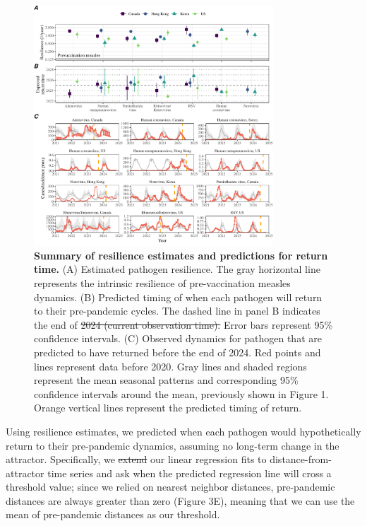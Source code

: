\documentclass[12pt]{article}
\newcommand{\comment}{\showcomment}
\newcommand{\showcomment}[3]{\textcolor{#1}{\textbf{[#2: }\textsl{#3}\textbf{]}}}
\newcommand{\swp}[1]{\comment{magenta}{SWP}{#1}}
\providecommand{\DIFaddtex}[1]{{\protect\color{blue}\uwave{#1}}} %
\providecommand{\DIFdeltex}[1]{{\protect\color{red}\sout{#1}}}                      %
\providecommand{\DIFaddbegin}{} %
\providecommand{\DIFaddend}{} %
\providecommand{\DIFdelbegin}{} %
\providecommand{\DIFdelend}{} %
\providecommand{\DIFaddFL}[1]{\DIFadd{#1}} %
\providecommand{\DIFdelFL}[1]{\DIFdel{#1}} %
\providecommand{\DIFaddbeginFL}{} %
\providecommand{\DIFaddendFL}{} %
\providecommand{\DIFdelbeginFL}{} %
\providecommand{\DIFdelendFL}{} %
\providecommand{\DIFadd}[1]{\texorpdfstring{\DIFaddtex{#1}}{#1}} %
\providecommand{\DIFdel}[1]{\texorpdfstring{\DIFdeltex{#1}}{}} %
\newcommand{\DIFscaledelfig}{0.5}
\newlength{\DIFdelgraphicswidth} %
\newlength{\DIFdelgraphicsheight} %
\newcommand{\DIFaddincludegraphics}[2][]{{\color{blue}\fbox{\DIFOincludegraphics[#1]{#2}}}} %
\newcommand{\DIFdelincludegraphics}[2][]{%
\sbox{\DIFdelgraphicsbox}{\DIFOincludegraphics[#1]{#2}}%
\settoboxwidth{\DIFdelgraphicswidth}{\DIFdelgraphicsbox} %
\settoboxtotalheight{\DIFdelgraphicsheight}{\DIFdelgraphicsbox} %
\scalebox{\DIFscaledelfig}{%
\parbox[b]{\DIFdelgraphicswidth}{\usebox{\DIFdelgraphicsbox}\\[-\baselineskip] \rule{\DIFdelgraphicswidth}{0em}}\llap{\resizebox{\DIFdelgraphicswidth}{\DIFdelgraphicsheight}{%
\setlength{\unitlength}{\DIFdelgraphicswidth}%
\begin{picture}(1,1)%
\thicklines\linethickness{2pt} %
{\color[rgb]{1,0,0}\put(0,0){\framebox(1,1){}}}%
{\color[rgb]{1,0,0}\put(0,0){\line( 1,1){1}}}%
{\color[rgb]{1,0,0}\put(0,1){\line(1,-1){1}}}%
\end{picture}%
}\hspace*{3pt}}} %
} %
\DeclareRobustCommand{\DIFaddbegin}{\DIFOaddbegin \let\includegraphics\DIFaddincludegraphics} %
\DeclareRobustCommand{\DIFaddend}{\DIFOaddend \let\includegraphics\DIFOincludegraphics} %
\DeclareRobustCommand{\DIFdelbegin}{\DIFOdelbegin \let\includegraphics\DIFdelincludegraphics} %
\DeclareRobustCommand{\DIFdelend}{\DIFOaddend \let\includegraphics\DIFOincludegraphics} %
\DeclareRobustCommand{\DIFaddbeginFL}{\DIFOaddbeginFL \let\includegraphics\DIFaddincludegraphics} %
\DeclareRobustCommand{\DIFaddendFL}{\DIFOaddendFL \let\includegraphics\DIFOincludegraphics} %
\DeclareRobustCommand{\DIFdelbeginFL}{\DIFOdelbeginFL \let\includegraphics\DIFdelincludegraphics} %
\DeclareRobustCommand{\DIFdelendFL}{\DIFOaddendFL \let\includegraphics\DIFOincludegraphics} %
\begin{document}
\begin{figure}[!th]
\begin{center}
\includegraphics[width=0.8\textwidth]{../figure4/figure4.pdf}
\caption{
\textbf{Summary of resilience estimates and predictions for return time.}
(A) Estimated pathogen resilience.
The gray horizontal line represents the intrinsic resilience of pre-vaccination measles dynamics.
(B) Predicted timing of when each pathogen will return to their pre-pandemic cycles.
The dashed line in panel B indicates the end of \DIFdelbeginFL \DIFdelFL{2024 (current observation time).
}\DIFdelendFL \DIFaddbeginFL \DIFaddFL{2024.
}\DIFaddendFL Error bars represent 95\% confidence intervals.
(C) Observed dynamics for pathogen that are predicted to have returned before the end of 2024.
Red points and lines represent data before 2020.
Gray lines and shaded regions represent the mean seasonal patterns and corresponding 95\% confidence intervals around the mean, previously shown in Figure 1.
Orange vertical lines represent the predicted timing of return.
}
\end{center}
\end{figure}

\DIFdelbegin %
\DIFdelend Using resilience estimates, we predicted when each pathogen would hypothetically return to their pre-pandemic dynamics, assuming no long-term change in the attractor.
Specifically, we \DIFdelbegin \DIFdel{extend }\DIFdelend \DIFaddbegin \DIFadd{extended }\DIFaddend our linear regression fits to distance-from-attractor time series and ask when the predicted regression line will cross a threshold value;
since we relied on nearest neighbor distances, pre-pandemic distances are always greater than zero (Figure 3E), meaning that we can use the mean of pre-pandemic distances as our threshold.
\end{document}
